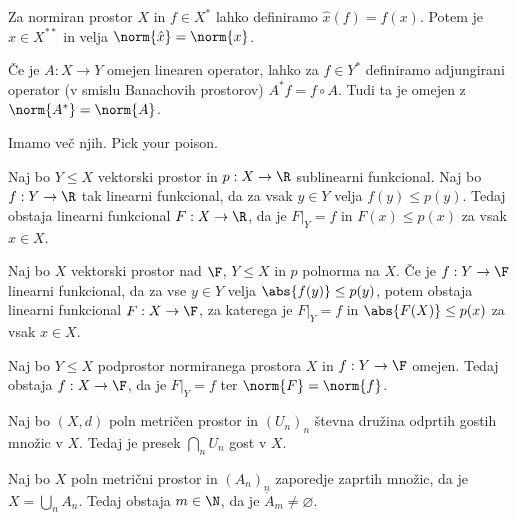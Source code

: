 Za normiran prostor $X$ in $f \in X^*$ lahko definiramo $\hat{x}(f) = f(x)$.
Potem je $\hat{x} \in X^{**}$ in velja $\norm{\hat{x}} =\norm{x}$.

Če je $A: X \to Y$ omejen linearen operator, lahko za $f \in Y^*$ definiramo
adjungirani operator (v smislu Banachovih prostorov) $A^* f = f \circ A$.
Tudi ta je omejen z $\norm{A^*} = \norm{A}$.



Imamo več njih.
Pick your poison.

\begin{izrek}
  Naj bo $Y \le X$ vektorski prostor in $p: X \to \R$ sublinearni funkcional.
  Naj bo $f: Y \to \R$ tak linearni funkcional, da za vsak $y \in Y$ velja $f(y)
  \le p(y)$.
  Tedaj obstaja linearni funkcional $F: X \to \R$, da je $\left. F \right|_Y =
  f$ in $F(x) \le p(x)$ za vsak $x \in X$.
\end{izrek}

\begin{izrek}
  Naj bo $X$ vektorski prostor nad $\F$, $Y \le X$ in $p$ polnorma na $X$.
  Če je $f: Y \to \F$ linearni funkcional, da za vse $y \in Y$ velja $\abs{f(y)}
  \le p(y)$, potem obstaja linearni funkcional $F: X \to \F$, za katerega je
  $\left. F \right|_Y = f$ in $\abs{F(X)} \le p(x)$ za vsak $x \in X$.
\end{izrek}

\begin{izrek}
  Naj bo $Y \le X$ podprostor normiranega prostora $X$ in $f: Y \to \F$ omejen.
  Tedaj obstaja $f: X \to \F$, da je $\left. F \right|_Y = f$ ter $\norm{F} =
  \norm{f}$.
\end{izrek}


\begin{izrek}[Baire]
  Naj bo $(X, d)$ poln metričen prostor in $(U_n)_n$ števna družina odprtih
  gostih množic v $X$.
  Tedaj je presek $\bigcap_n U_n$ gost v $X$.
\end{izrek}

\begin{posledica}
  Naj bo $X$ poln metrični prostor in $(A_n)_n$ zaporedje zaprtih množic, da je
  $X = \bigcup_n A_n$.
  Tedaj obstaja $m \in \N$, da je $\mathring{A}_m \ne \varnothing$.
\end{posledica}

